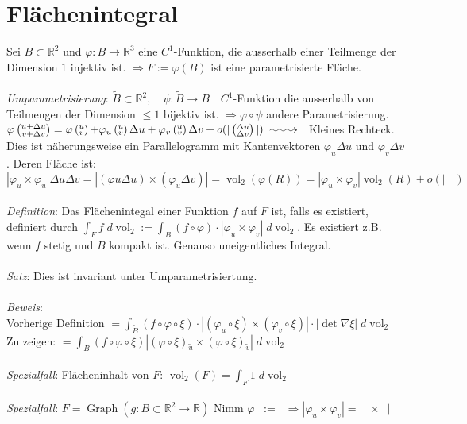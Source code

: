\documentclass[12pt,a4paper,titlepage]{article}
\makeatletter
\newcommand{\longsquiggly}{\xymatrix{{}\ar@{~>}[r]&{}}}
\newcommand{\setR}{\mathbb{R}}
\newcommand{\Graph}{\operatorname{Graph}}
\newcommand{\vol}{\operatorname{vol}}
\newcommand{\twovec}[2]{\mathop{\left(\substack{#1 \\ #2}\right)}}
\newcommand{\threevec}[3]{\mathop{\left(\substack{#1 \\ #2 \\ #3}\right)}}
\makeatother
\begin{document}
\section*{Flächenintegral}
Sei $B\subset\setR^2$ und $\varphi:B\to\setR^3$ eine $C^1$-Funktion, die ausserhalb einer Teilmenge der Dimension $1$ injektiv ist. $\Rightarrow F:=\varphi(B)$ ist eine parametrisierte Fläche. \\
\\
\textit{Umparametrisierung}: $\widetilde{B}\subset\setR^2, \quad\psi:\widetilde{B}\to B \quad C^1$-Funktion die ausserhalb von Teilmengen der Dimension $\leq 1$ bijektiv ist. $\Rightarrow \varphi\circ\psi$ andere Parametrisierung. \\
$\varphi\twovec{u+\Delta u}{v+\Delta v}=\varphi\twovec{u}{v}+\varphi_u\twovec{u}{v}\Delta u+\varphi_v\twovec{u}{v}\Delta v+o(|\twovec{\Delta u}{\Delta v}|) \longsquiggly $ Kleines Rechteck. Dies ist näherungsweise ein Parallelogramm mit Kantenvektoren $\varphi_u\Delta u$ und $\varphi_v\Delta v$. Deren Fläche ist: \\
$|\varphi_u\times\varphi_u|\Delta u\Delta v = |(\varphi u \Delta u)\times(\varphi_u\Delta v)| = \vol_2(\varphi(R))=|\varphi_u\times\varphi_v|\vol_2(R)+o(|\twovec{\Delta u}{\Delta v}|)$ \\
\\
\textit{Definition}: Das Flächenintegal einer Funktion $f$ auf $F$ ist, falls es existiert, definiert durch $\int_Ff \;d\vol_2 := \int_B(f\circ\varphi)\cdot|\varphi_u\times\varphi_v| \;d\vol_2$. Es existiert z.B. wenn $f$ stetig und $B$ kompakt ist. Genauso uneigentliches Integral. \\
\\
\textit{Satz}: Dies ist invariant unter Umparametrisiertung.\\
\\
\textit{Beweis}:\\
  Vorherige Definition $=\int_{\widetilde{B}}(f\circ\varphi\circ\xi)\cdot |(\varphi_u\circ\xi)\times(\varphi_v\circ\xi)|\cdot|\det\nabla\xi| \;d\vol_2$ \\
Zu zeigen: $= \int_B(f\circ\varphi\circ\xi)|(\varphi\circ\xi)_{\widetilde{u}}\times(\varphi\circ\xi)_{\widetilde{v}}| \;d\vol_2$\\
\\
\textit{Spezialfall}: Flächeninhalt von $F$: $\vol_2(F)=\int_F1 \;d\vol_2$ \\
\\
\textit{Spezialfall}: $F=\Graph(g:B\subset\setR^2\to\setR)$ Nimm $\varphi\twovec{u}{v}:=\threevec{u}{v}{g\twovec{u}{v}} \Rightarrow |\varphi_u\times\varphi_v|=\left|\threevec{1}{0}{g_u}\times\threevec{0}{1}{g_v}\right|$ \\
\end{document}
